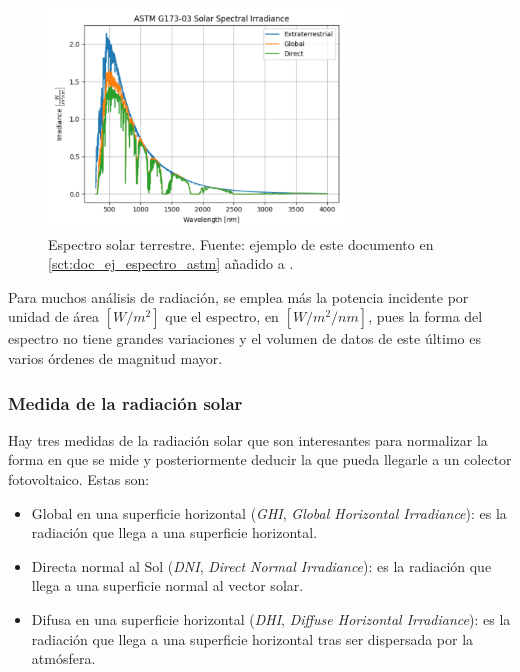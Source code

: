 \begin{figure}[H]
      \centering
      \includegraphics[width=0.7\textwidth]{./images/SoA_irrad/astm_g173-03.png}
      \caption{Espectro solar terrestre. Fuente: ejemplo de este documento en \ref{sct:doc_ej_espectro_astm} añadido a \pvlibpy{}.}
      \label{fig:solar_spectrum}
\end{figure}

Para muchos análisis de radiación, se emplea más la potencia incidente por unidad de área $[W/m^2]$ que el espectro, en $[W/m^2/nm]$, pues la forma del espectro no tiene grandes variaciones y el volumen de datos de este último es varios órdenes de magnitud mayor.

\subsubsection{Medida de la radiación solar}

Hay tres medidas de la radiación solar que son interesantes para normalizar la forma en que se mide y posteriormente deducir la que pueda llegarle a un colector fotovoltaico. Estas son:

\begin{itemize}
      \item Global en una superficie horizontal (\textit{\gls{GHI}}, \textit{Global Horizontal Irradiance}): es la radiación que llega a una superficie horizontal.
      \item Directa normal al Sol (\textit{\gls{DNI}}, \textit{Direct Normal Irradiance}): es la radiación que llega a una superficie normal al vector solar.
      \item Difusa en una superficie horizontal (\textit{\gls{DHI}}, \textit{Diffuse Horizontal Irradiance}): es la radiación que llega a una superficie horizontal tras ser dispersada por la atmósfera.
\end{itemize}

